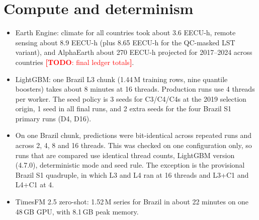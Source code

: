 \documentclass[11pt]{article}
\DeclareRobustCommand{\todo}[1]{\textcolor{red}{\textbf{[TODO}\if\relax\detokenize{#1}\relax\else: #1\fi\textbf{]}}}
\begin{document}
\section{Compute and determinism}
\label{app:compute}
\begin{itemize}
  \item Earth Engine: climate for all countries took about 3.6 EECU-h, remote sensing about 8.9 EECU-h (plus 8.65 EECU-h for
  the QC-masked LST variant), and AlphaEarth about 270 EECU-h projected for 2017--2024 across countries
  \todo{final ledger totals}.
  \item LightGBM: one Brazil L3 chunk (1.44\,M training rows, nine quantile boosters) takes about 8 minutes at 16 threads.
  Production runs use 4 threads per worker. The seed policy is 3 seeds for C3/C4/C4s at the 2019 selection origin,
  1 seed in all final runs, and 2 extra seeds for the four Brazil S1 primary runs (D4, D16).
  \item On one Brazil chunk, predictions were bit-identical across repeated runs and across 2, 4, 8 and 16 threads.
  This was checked on one configuration only, so runs that are compared use identical thread counts, LightGBM
  version (4.7.0), deterministic mode and seed rule. The exception is the provisional Brazil S1 quadruple, in which
  L3 and L4 ran at 16 threads and L3+C1 and L4+C1 at 4.
  \item TimesFM 2.5 zero-shot: 1.52\,M series for Brazil in about 22 minutes on one 48\,GB GPU, with 8.1\,GB peak memory.
\end{itemize}
\end{document}
